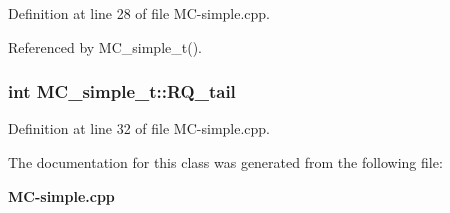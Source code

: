Definition at line 28 of file MC-simple.cpp.

Referenced by MC\_\-simple\_\-t().
\subsubsection[{RQ\_\-tail}]{\setlength{\rightskip}{0pt plus 5cm}int {\bf MC\_\-simple\_\-t::RQ\_\-tail}\hspace{0.3cm}{\tt  [protected]}}\label{classMC__simple__t_94bfd78d767f71a409005a6493febfaa}




Definition at line 32 of file MC-simple.cpp.

The documentation for this class was generated from the following file:\begin{CompactItemize}
\item 
{\bf MC-simple.cpp}\end{CompactItemize}
